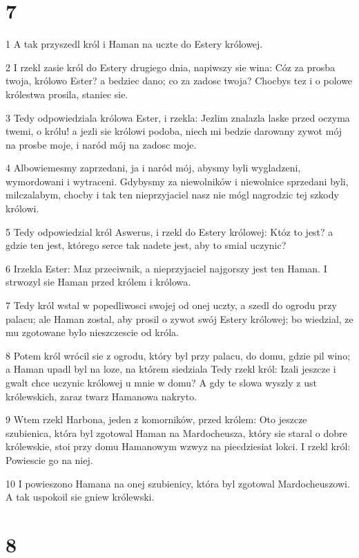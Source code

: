 \chapter{7}

\par 1 A tak przyszedl król i Haman na uczte do Estery królowej.
\par 2 I rzekl zasie król do Estery drugiego dnia, napiwszy sie wina: Cóz za prosba twoja, królowo Ester? a bedziec dano; co za zadosc twoja? Chocbys tez i o polowe królestwa prosila, staniec sie.
\par 3 Tedy odpowiedziala królowa Ester, i rzekla: Jezlim znalazla laske przed oczyma twemi, o królu! a jezli sie królowi podoba, niech mi bedzie darowany zywot mój na prosbe moje, i naród mój na zadosc moje.
\par 4 Albowiemesmy zaprzedani, ja i naród mój, abysmy byli wygladzeni, wymordowani i wytraceni. Gdybysmy za niewolników i niewolnice sprzedani byli, milczalabym, chocby i tak ten nieprzyjaciel nasz nie mógl nagrodzic tej szkody królowi.
\par 5 Tedy odpowiedzial król Aswerus, i rzekl do Estery królowej: Któz to jest? a gdzie ten jest, którego serce tak nadete jest, aby to smial uczynic?
\par 6 Irzekla Ester: Maz przeciwnik, a nieprzyjaciel najgorszy jest ten Haman. I strwozyl sie Haman przed królem i królowa.
\par 7 Tedy król wstal w popedliwosci swojej od onej uczty, a szedl do ogrodu przy palacu; ale Haman zostal, aby prosil o zywot swój Estery królowej; bo wiedzial, ze mu zgotowane bylo nieszczescie od króla.
\par 8 Potem król wrócil sie z ogrodu, który byl przy palacu, do domu, gdzie pil wino; a Haman upadl byl na loze, na którem siedziala Tedy rzekl król: Izali jeszcze i gwalt chce uczynic królowej u mnie w domu? A gdy te slowa wyszly z ust królewskich, zaraz twarz Hamanowa nakryto.
\par 9 Wtem rzekl Harbona, jeden z komorników, przed królem: Oto jeszcze szubienica, która byl zgotowal Haman na Mardocheusza, który sie staral o dobre królewskie, stoi przy domu Hamanowym wzwyz na piecdziesiat lokci. I rzekl król: Powiescie go na niej.
\par 10 I powieszono Hamana na onej szubienicy, która byl zgotowal Mardocheuszowi. A tak uspokoil sie gniew królewski.

\chapter{8}

